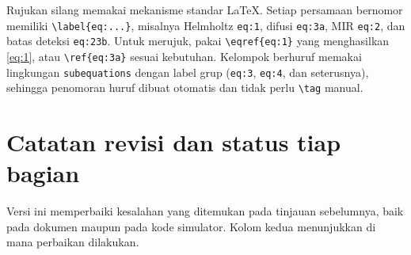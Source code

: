 \documentclass[a4paper,11pt]{article}
\begin{document}
Rujukan silang memakai mekanisme standar LaTeX.
Setiap persamaan bernomor memiliki \texttt{\textbackslash label\{eq:...\}},
misalnya Helmholtz \texttt{eq:1}, difusi \texttt{eq:3a},
MIR \texttt{eq:2}, dan batas deteksi \texttt{eq:23b}.
Untuk merujuk, pakai \texttt{\textbackslash eqref\{eq:1\}} yang menghasilkan
\eqref{eq:1}, atau \texttt{\textbackslash ref\{eq:3a\}} sesuai kebutuhan.
Kelompok berhuruf memakai lingkungan \texttt{subequations} dengan label
grup (\texttt{eq:3}, \texttt{eq:4}, dan seterusnya), sehingga penomoran
huruf dibuat otomatis dan tidak perlu \texttt{\textbackslash tag}
manual.

\section{Catatan revisi dan status tiap bagian}
Versi ini memperbaiki kesalahan yang ditemukan pada tinjauan sebelumnya,
baik pada dokumen maupun pada kode simulator.
Kolom kedua menunjukkan di mana perbaikan dilakukan.
\end{document}
